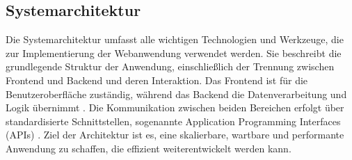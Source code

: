 \subsection{Systemarchitektur}
Die Systemarchitektur umfasst alle wichtigen Technologien und Werkzeuge, die zur Implementierung der Webanwendung verwendet werden. Sie beschreibt die grundlegende Struktur der Anwendung, einschließlich der Trennung zwischen Frontend und Backend und deren Interaktion. Das Frontend ist für die Benutzeroberfläche zuständig, während das Backend die Datenverarbeitung und Logik übernimmt \parencite{mccartney-2024}. Die Kommunikation zwischen beiden Bereichen erfolgt über standardisierte Schnittstellen, sogenannte Application Programming Interfaces (APIs) \parencite{gazarov-2019}. Ziel der Architektur ist es, eine skalierbare, wartbare und performante Anwendung zu schaffen, die effizient weiterentwickelt werden kann.
